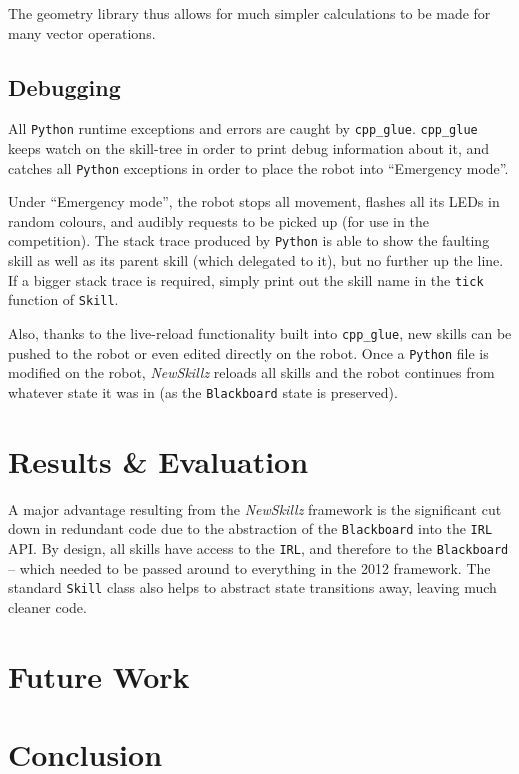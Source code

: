 The geometry library thus allows for much simpler calculations to be made for many vector operations.

\subsection{Debugging} 

All \verb!Python! runtime exceptions and errors are caught by \texttt{cpp\_glue}. \texttt{cpp\_glue} keeps watch on the skill-tree in order to print debug information about it, and catches all \verb!Python! exceptions in order to place the robot into ``Emergency mode''.

Under ``Emergency mode'', the robot stops all movement, flashes all its LEDs in random colours, and audibly requests to be picked up (for use in the competition). The stack trace produced by \verb!Python! is able to show the faulting skill as well as its parent skill (which delegated to it), but no further up the line. If a bigger stack trace is required, simply print out the skill name in the \texttt{tick} function of \texttt{Skill}.

Also, thanks to the live-reload functionality built into \texttt{cpp\_glue}, new skills can be pushed to the robot or even edited directly on the robot. Once a \verb!Python! file is modified on the robot, \textit{NewSkillz} reloads all skills and the robot continues from whatever state it was in (as the \texttt{Blackboard} state is preserved).

\section{Results \& Evaluation}

A major advantage resulting from the \textit{NewSkillz} framework is the significant cut down in redundant code due to the abstraction of the \texttt{Blackboard} into the \texttt{IRL} API. By design, all skills have access to the \texttt{IRL}, and therefore to the \texttt{Blackboard} -- which needed to be passed around to everything in the 2012 framework. The standard \texttt{Skill} class also helps to abstract state transitions away, leaving much cleaner code.

\section{Future Work}


\section{Conclusion}
